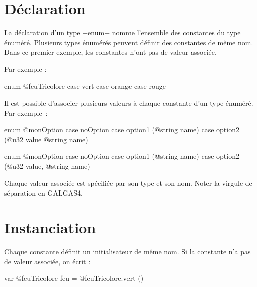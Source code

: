




\section{Déclaration}

La déclaration d'un type \ggsq+enum+ nomme l'ensemble des constantes du type énuméré. Plusieurs types énumérés peuvent définir des constantes de même nom. Dans ce premier exemple, les constantes n'ont pas de valeur associée.

Par exemple :

\begin{galgas4}
enum @feuTricolore {
  case vert
  case orange
  case rouge
}
\end{galgas4}

Il est possible d'associer plusieurs valeurs à chaque constante d'un type énuméré. Par exemple~:

\begin{galgas4}
enum @monOption {
  case noOption
  case option1 (@string name)
  case option2 (@u32 value @string name)
}
\end{galgas4}

\begin{galgas4}
enum @monOption {
  case noOption
  case option1 (@string name)
  case option2 (@u32 value, @string name)
}
\end{galgas4}

Chaque valeur associée est spécifiée par son type et son nom. Noter la virgule de séparation en GALGAS4.






\section{Instanciation}

Chaque constante définit un initialisateur de même nom. Si la constante n'a pas de valeur associée, on écrit :

\begin{galgas4}
var @feuTricolore feu = @feuTricolore.vert ()
\end{galgas4}

